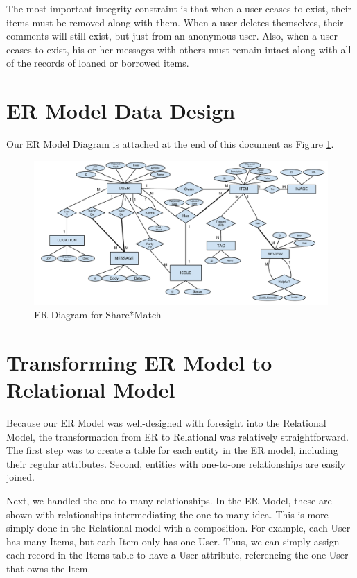 \documentclass{acm_proc_article-sp}
\begin{document}
The most important integrity constraint is that when a user ceases to exist, their items must be removed along with them. When a user deletes themselves, their comments will still exist, but just from an anonymous user. Also, when a user ceases to exist, his or her messages with others must remain intact along with all of the records of loaned or borrowed items.

\section{ER Model Data Design}
Our ER Model Diagram is attached at the end of this document as Figure \ref{fig:ERDiagram}.
\begin{figure}[p]
    \includegraphics[width=\textwidth]{EECS341ProjectERDiagram.pdf}
    \caption{ER Diagram for Share*Match}
    \label{fig:ERDiagram}
\end{figure}

\section{Transforming ER Model to Relational Model}
Because our ER Model was well-designed with foresight into the Relational Model, the transformation from ER to Relational was relatively straightforward. The first step was to create a table for each entity in the ER model, including their regular attributes. Second, entities with one-to-one relationships are easily joined.

Next, we handled the one-to-many relationships. In the ER Model, these are shown with relationships intermediating the one-to-many idea. This is more simply done in the Relational model with a composition. For example, each User has many Items, but each Item only has one User. Thus, we can simply assign each record in the Items table to have a User attribute, referencing the one User that owns the Item.
\end{document}
